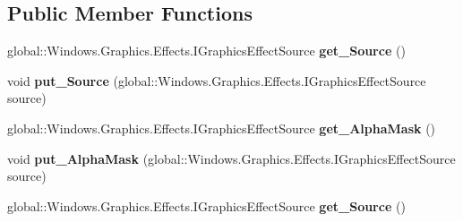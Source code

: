 \subsection*{Public Member Functions}
\begin{DoxyCompactItemize}
\item 
\mbox{\label{interface_microsoft_1_1_graphics_1_1_canvas_1_1_effects_1_1_i_alpha_mask_effect_ac93fcaf27f7daab93dd8e361bb5e9bbf}} 
global\+::\+Windows.\+Graphics.\+Effects.\+I\+Graphics\+Effect\+Source {\bfseries get\+\_\+\+Source} ()
\item 
\mbox{\label{interface_microsoft_1_1_graphics_1_1_canvas_1_1_effects_1_1_i_alpha_mask_effect_ab4e559cfdcb7d7d7f1565fcc913c7608}} 
void {\bfseries put\+\_\+\+Source} (global\+::\+Windows.\+Graphics.\+Effects.\+I\+Graphics\+Effect\+Source source)
\item 
\mbox{\label{interface_microsoft_1_1_graphics_1_1_canvas_1_1_effects_1_1_i_alpha_mask_effect_a2ec5e6658267b1e3270f21e97ad18181}} 
global\+::\+Windows.\+Graphics.\+Effects.\+I\+Graphics\+Effect\+Source {\bfseries get\+\_\+\+Alpha\+Mask} ()
\item 
\mbox{\label{interface_microsoft_1_1_graphics_1_1_canvas_1_1_effects_1_1_i_alpha_mask_effect_a1057d37b21df4170ef6ae26c9fa68624}} 
void {\bfseries put\+\_\+\+Alpha\+Mask} (global\+::\+Windows.\+Graphics.\+Effects.\+I\+Graphics\+Effect\+Source source)
\item 
\mbox{\label{interface_microsoft_1_1_graphics_1_1_canvas_1_1_effects_1_1_i_alpha_mask_effect_ac93fcaf27f7daab93dd8e361bb5e9bbf}} 
global\+::\+Windows.\+Graphics.\+Effects.\+I\+Graphics\+Effect\+Source {\bfseries get\+\_\+\+Source} ()
\item 
\mbox{\label{interface_microsoft_1_1_graphics_1_1_canvas_1_1_effects_1_1_i_alpha_mask_effect_ab4e559cfdcb7d7d7f1565fcc913c7608}} 

\end{DoxyCompactItemize}
